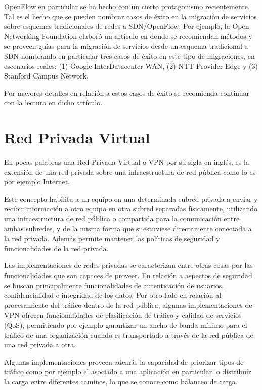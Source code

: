 OpenFlow en particular se ha hecho con un cierto protagonismo recientemente. Tal es el hecho que se pueden nombrar casos de éxito en la migración de servicios sobre esquemas tradicionales de redes a SDN/OpenFlow. Por ejemplo, la Open Networking Foundation elabor\'o un art\'iculo \cite{ONFSuccessCase} en donde se recomiendan métodos y se proveen guías para la migración de servicios desde un esquema tradicional a SDN nombrando en particular tres casos de éxito en este tipo de migraciones, en escenarios reales: (1) Google InterDatacenter WAN, (2) NTT Provider Edge y (3) Stanford Campus Network.

Por mayores detalles en relación a estos casos de \'exito se recomienda continuar con la lectura en dicho art\'iculo.

\section{Red Privada Virtual}
\label{section2.7}

En pocas palabras una Red Privada Virtual o VPN por su sigla en ingl\'es, es la extensi\'on de una red privada sobre una infraestructura de red p\'ublica como lo es por ejemplo Internet.

Este concepto habilita a un equipo en una determinada subred privada a enviar y recibir información a otro equipo en otra subred separadas f\'isicamente, utilizando una infraestructura de red p\'ublica o compartida para la comunicaci\'on entre ambas subredes, y de la misma forma que si estuviese directamente conectada a la red privada. Adem\'as permite mantener las políticas de seguridad y funcionalidades de la red privada.

Las implementaciones de redes privadas se caracterizan entre otras cosas por las funcionalidades que son capaces de proveer. En relaci\'on a aspectos de seguridad se buscan principalmente funcionalidades de autenticaci\'on de usuarios, confidencialidad e integridad de los datos. Por otro lado en relaci\'on al procesamiento del tr\'afico dentro de la red p\'ublica, algunas implementaciones de VPN ofrecen funcionalidades de clasificaci\'on de tr\'afico y calidad de servicios (QoS), permitiendo por ejemplo garantizar un ancho de banda m\'inimo para el tr\'afico de una organizaci\'on cuando es transportado a trav\'es de la red p\'ublica de una red privada a otra. 

Algunas implementaciones proveen adem\'as la capacidad de priorizar tipos de tr\'afico como por ejemplo el asociado a una aplicaci\'on en particular, o distribu\'ir la carga entre diferentes caminos, lo que se conoce como balanceo de carga.

